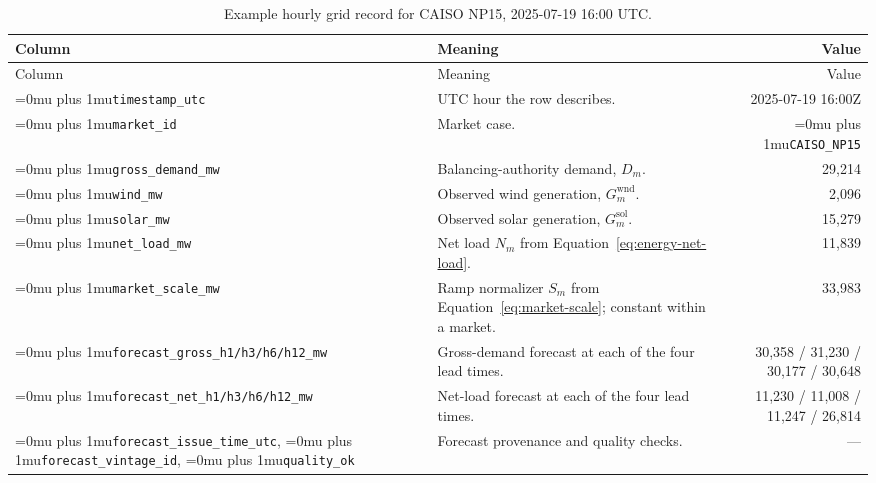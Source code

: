 \documentclass[conference]{IEEEtran}
\newcommand{\codepath}[1]{{\Urlmuskip=0mu plus 1mu\relax\nolinkurl{#1}}}
\begin{document}
\begingroup
\small
\begin{longtable}{@{}L{0.26\textwidth}L{0.40\textwidth}r@{}}
\caption{Example hourly grid record for CAISO NP15, 2025-07-19 16:00 UTC.}
  \label{tab:panel-columns}\\
    \toprule
    Column & Meaning & Value \\
    \midrule
  \endfirsthead
    \toprule
    Column & Meaning & Value \\
    \midrule
  \endhead
    \codepath{timestamp_utc}
      & UTC hour the row describes.
      & 2025-07-19 16:00Z \\
    \codepath{market_id}
      & Market case.
      & \codepath{CAISO_NP15} \\
    \addlinespace
    \codepath{gross_demand_mw}
      & Balancing-authority demand, \(D_m\).
      & 29,214 \\
    \codepath{wind_mw}
      & Observed wind generation, \(G^{\mathrm{wnd}}_m\).
      & 2,096 \\
    \codepath{solar_mw}
      & Observed solar generation, \(G^{\mathrm{sol}}_m\).
      & 15,279 \\
    \codepath{net_load_mw}
      & Net load \(N_m\) from Equation~\eqref{eq:energy-net-load}.
      & 11,839 \\
    \addlinespace
    \codepath{market_scale_mw}
      & Ramp normalizer \(S_m\) from Equation~\eqref{eq:market-scale};
        constant within a market.
      & 33,983 \\
    \addlinespace
    \codepath{forecast_gross_h1/h3/h6/h12_mw}
      & Gross-demand forecast at each of the four lead times.
      & 30,358 / 31,230 / 30,177 / 30,648 \\
    \codepath{forecast_net_h1/h3/h6/h12_mw}
      & Net-load forecast at each of the four lead times.
      & 11,230 / 11,008 / 11,247 / 26,814 \\
    \codepath{forecast_issue_time_utc},
    \codepath{forecast_vintage_id},
    \codepath{quality_ok}
      & Forecast provenance and quality checks.
      & --- \\
    \bottomrule
\end{longtable}
\endgroup
\end{document}
